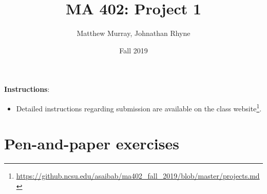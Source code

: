 \documentclass[answers,10pt]{exam}
\title{MA 402: Project 1}
\author{Matthew Murray, Johnathan Rhyne}
\date{Fall 2019}
\begin{document}
\maketitle
\textbf{Instructions}: 

\begin{itemize}
\item Detailed instructions regarding submission are available on the class website\footnote{\url{https://github.ncsu.edu/asaibab/ma402_fall_2019/blob/master/projects.md}}. 
\end{itemize}

\vspace{2mm}


\section{Pen-and-paper exercises}
\end{document}
